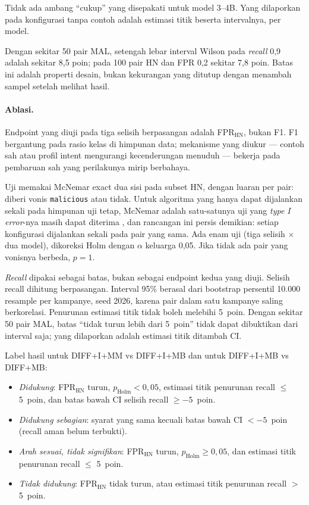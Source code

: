 \documentclass[a4paper,fleqn]{cas-dc}
\begin{document}
Tidak ada ambang ``cukup'' yang disepakati untuk model 3--4B. Yang dilaporkan
pada konfigurasi tanpa contoh adalah estimasi titik beserta intervalnya, per
model.

Dengan sekitar 50 pair MAL, setengah lebar interval Wilson pada \emph{recall}
0,9 adalah sekitar 8,5 poin; pada 100 pair HN dan FPR 0,2 sekitar 7,8 poin.
Batas ini adalah properti desain, bukan kekurangan yang ditutup dengan
menambah sampel setelah melihat hasil.

\paragraph{Ablasi.}
Endpoint yang diuji pada tiga selisih berpasangan adalah FPR$_{\mathrm{HN}}$,
bukan F1. F1 bergantung pada rasio kelas di himpunan data; mekanisme yang
diukur --- contoh sah atau profil intent mengurangi kecenderungan menuduh ---
bekerja pada pembaruan sah yang perilakunya mirip berbahaya.

Uji memakai McNemar exact dua sisi pada subset HN, dengan luaran per pair:
diberi vonis \texttt{malicious} atau tidak. Untuk algoritma yang hanya dapat
dijalankan sekali pada himpunan uji tetap, McNemar adalah satu-satunya uji yang
\emph{type I error}-nya masih dapat diterima \citep{dietterich1998approximate},
dan rancangan ini persis demikian: setiap konfigurasi dijalankan sekali pada
pair yang sama. Ada enam uji (tiga selisih
$\times$ dua model), dikoreksi Holm dengan $\alpha$ keluarga 0,05. Jika tidak
ada pair yang vonisnya berbeda, $p{=}1$.

\emph{Recall} dipakai sebagai batas, bukan sebagai endpoint kedua yang diuji.
Selisih recall dihitung berpasangan. Interval 95\% berasal dari bootstrap
persentil 10.000 resample per kampanye, seed 2026, karena pair dalam satu
kampanye saling berkorelasi. Penurunan estimasi titik tidak boleh melebihi
5~poin. Dengan sekitar 50 pair MAL, batas ``tidak turun lebih dari 5~poin''
tidak dapat dibuktikan dari interval saja; yang dilaporkan adalah estimasi
titik ditambah CI.

Label hasil untuk DIFF+I+MM vs DIFF+I+MB dan untuk DIFF+I+MB vs DIFF+MB:

\begin{itemize}
\item \emph{Didukung}: FPR$_{\mathrm{HN}}$ turun, $p_{\mathrm{Holm}}{<}0{,}05$,
estimasi titik penurunan recall $\le$ 5~poin, dan batas bawah CI selisih
recall $\ge{-}5$~poin.
\item \emph{Didukung sebagian}: syarat yang sama kecuali batas bawah CI
$<{-}5$~poin (recall aman belum terbukti).
\item \emph{Arah sesuai, tidak signifikan}: FPR$_{\mathrm{HN}}$ turun,
$p_{\mathrm{Holm}}{\ge}0{,}05$, dan estimasi titik penurunan recall $\le$ 5~poin.
\item \emph{Tidak didukung}: FPR$_{\mathrm{HN}}$ tidak turun, atau estimasi
titik penurunan recall $>$ 5~poin.
\end{itemize}
\end{document}
